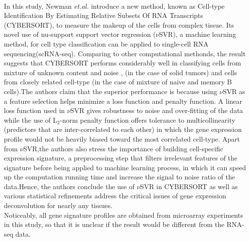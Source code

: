 \documentclass{article}
\begin{document}
%

  
\medskip
\paragraph{}
In this study, Newman \textit{et.al.} introduce a new method, known as Cell-type Identification By Estimating Relative Subsets Of RNA Transcripts (CYBERSORT), to measure the makeup of the cells from complex tissue. Its novel use of nu-support support vector regression ($\nu$SVR), a machine learning method, for cell type classification can be applied to single-cell RNA sequencing(scRNA-seq). Comparing to other computational methonds, the result suggests that CYBERSORT performs considerably well in classifying cells from mixture of unknown content and noise , (in the case of solid tumors) and cells from closely related cell-type (in the case of mixture of naive and memory B cells).The authors claim that the superior performance is because using $\nu$SVR as a feature selection helps minimize a loss function and penalty function. A linear loss function used in $\nu$SVR gives robustness to noise and over-fitting of the data while the use of L$_{2}$-norm penalty function offers tolerance to multicollinearity (predictors that are inter-correlated to each other) in which the gene expression profile would not be heavily biased toward the most correlated cell-type. Apart from $\nu$SVR,the authors also stress the importance of building cell-specific expression signature, a preprocessing step that filters irrelevant features of the signature before being applied to machine learning process, in which it can speed up the computation running time and increase the signal to noise ratio of the data.Hence, the authors conclude the use of $\nu$SVR in CYBERSORT as well as various statistical refinements address the critical issues of gene expression deconvolution for nearly any tissues.\\ 

Noticeably, all gene signature profiles are obtained from microarray experiments in this study, so that it is unclear if the result would be different from the RNA-seq data. 
\end{document}
